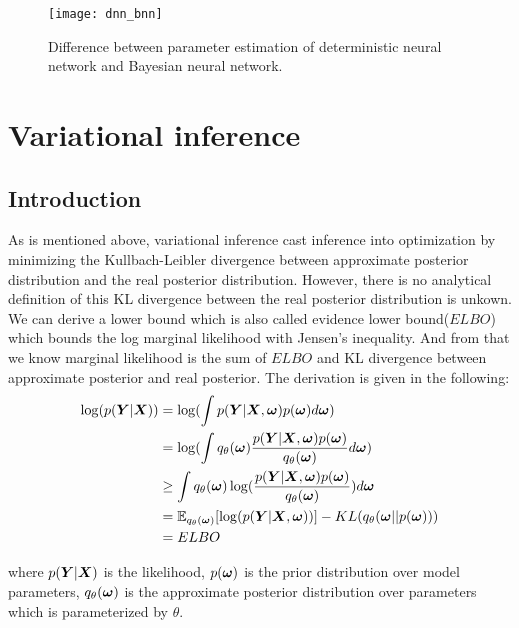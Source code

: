 \begin{figure}[H]
	\begin{center}
		\texttt{[image: dnn\_bnn]}
		\caption{Difference between parameter estimation of deterministic neural network and Bayesian neural network.}		
		\label{fig:dnn_bnn}
	\end{center}
\end{figure}

\section{Variational inference}
\subsection{Introduction}
As is mentioned above, variational inference cast inference into optimization by minimizing the Kullbach-Leibler divergence between approximate posterior distribution and the real posterior distribution. However, there is no analytical definition of this KL divergence between the real posterior distribution is unkown. We can derive a lower bound which is also called evidence lower bound($ELBO$) which bounds the log marginal likelihood with Jensen's inequality. And from that we know marginal likelihood is the sum of $ELBO$ and KL divergence between approximate posterior and real posterior. The derivation is given in the following:
\begin{equation}\label{2.6}	
\begin{aligned}
	\log(p(\boldsymbol{Y}|\boldsymbol{X})) & = \log(\int p(\boldsymbol{Y}| \boldsymbol{X}, \boldsymbol{\omega})  p(\boldsymbol{\omega})d\boldsymbol{\omega}) \\	 
	& = \log(\int{q_{\theta}(\boldsymbol{\omega}) \frac{p(\boldsymbol{Y}| \boldsymbol{X}, \boldsymbol{\omega}) p(\boldsymbol{\omega})}{q_{\theta}(\boldsymbol{\omega})}d\boldsymbol{\omega}}) \\
	& \geq \int q_{\theta}(\boldsymbol{\omega}) \log( \frac{p(\boldsymbol{Y}| \boldsymbol{X}, \boldsymbol{\omega}) p(\boldsymbol{\omega})}{q_{\theta}(\boldsymbol{\omega})}) d\boldsymbol{\omega} \\
	& = \mathbb E_{q_{\theta}(\boldsymbol{\omega})}[\log(p(\boldsymbol{Y}| \boldsymbol{X}, \boldsymbol{\omega}))] -  KL(q_{\theta}(\boldsymbol{\omega}||p(\boldsymbol{\omega})))\\
	& = ELBO
\end{aligned}
\end{equation}

where $p(\boldsymbol Y| \boldsymbol X)$ is the likelihood, $p(\boldsymbol \omega)$ is the prior distribution over model parameters, $q_{\theta}(\boldsymbol \omega)$ is the approximate posterior distribution over parameters which is parameterized by $\theta$.

